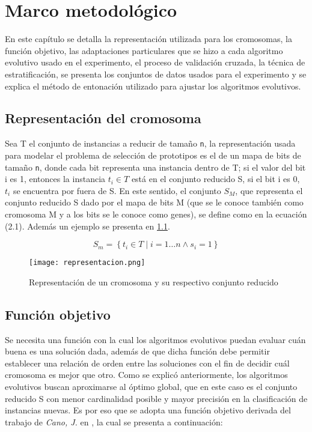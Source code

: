 \chapter{Marco metodológico}
\label{capitulo2}

En este capítulo se detalla la representación utilizada para los cromosomas, la función objetivo, las adaptaciones particulares que se hizo a cada algoritmo evolutivo usado en el experimento, el proceso de validación cruzada, la técnica de estratificación, se presenta los conjuntos de datos usados para el experimento y se explica el método de entonación utilizado para ajustar los algoritmos evolutivos.

\section{Representación del cromosoma}

Sea T el conjunto de instancias a reducir de tamaño \texttt{n}, la representación usada para modelar el problema de selección de prototipos es el de un mapa de bits de tamaño \texttt{n}, donde cada bit representa una instancia dentro de T; si el valor del bit i es 1, entonces la instancia $t_i \in T$ está en el conjunto reducido S, si el bit i es 0, $t_i$ se encuentra por fuera de S. En este sentido, el conjunto $S_M$, que representa el conjunto reducido S dado por el mapa de bits M (que se le conoce también como cromosoma M y a los bits se le conoce como genes), se define como en la ecuación (2.1). Además un ejemplo se presenta en \ref{representacion}.

\begin{equation}
S_m = \left\{ t_i \in T \mid i = 1 \dots n \land s_i = 1 \right\}
\end{equation} 

\begin{figure}[]
\centering
\texttt{[image: representacion.png]}
\caption[Representación de un cromosoma y su respectivo conjunto reducido]{Representación de un cromosoma y su respectivo conjunto reducido}
\label{representacion}
\end{figure}

\section{Función objetivo}

Se necesita una función con la cual los algoritmos evolutivos puedan evaluar cuán buena es una solución dada, además de que dicha función debe permitir establecer una relación de orden entre las soluciones con el fin de decidir cuál cromosoma es mejor que otro. Como se explicó anteriormente, los algoritmos evolutivos buscan aproximarse al óptimo global, que en este caso es el conjunto reducido S con menor cardinalidad posible y mayor precisión en la clasificación de instancias nuevas. Es por eso que se adopta una función objetivo derivada del trabajo de \emph{Cano, J.} en \cite{de2004reduccion}, la cual se presenta a continuación:

